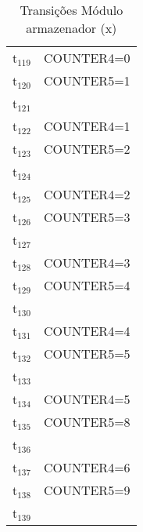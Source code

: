\begin{table}[htbp]
\caption{Transições Módulo armazenador (x)}
\centering
\begin{tabular}{ll}
t\(_{\text{119}}\) & COUNTER4=0\\
t\(_{\text{120}}\) & COUNTER5=1\\
t\(_{\text{121}}\) & \\
t\(_{\text{122}}\) & COUNTER4=1\\
t\(_{\text{123}}\) & COUNTER5=2\\
t\(_{\text{124}}\) & \\
t\(_{\text{125}}\) & COUNTER4=2\\
t\(_{\text{126}}\) & COUNTER5=3\\
t\(_{\text{127}}\) & \\
t\(_{\text{128}}\) & COUNTER4=3\\
t\(_{\text{129}}\) & COUNTER5=4\\
t\(_{\text{130}}\) & \\
t\(_{\text{131}}\) & COUNTER4=4\\
t\(_{\text{132}}\) & COUNTER5=5\\
t\(_{\text{133}}\) & \\
t\(_{\text{134}}\) & COUNTER4=5\\
t\(_{\text{135}}\) & COUNTER5=8\\
t\(_{\text{136}}\) & \\
t\(_{\text{137}}\) & COUNTER4=6\\
t\(_{\text{138}}\) & COUNTER5=9\\
t\(_{\text{139}}\) & \\
\end{tabular}
\end{table}
